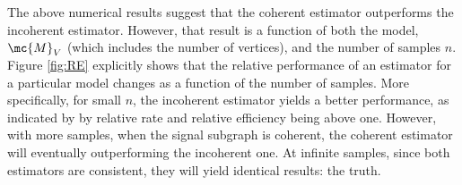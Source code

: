 \documentclass[10pt,journal,cspaper,compsoc]{IEEEtran}
\begin{document}
The above numerical results suggest that the coherent estimator outperforms the incoherent estimator.  However, that result is a function of both the model, $\mc{M}_V$ (which includes the number of vertices), and the number of samples $n$.  %
Figure \ref{fig:RE} explicitly shows that the relative performance of an estimator for a particular model changes as a function of the number of samples.  More specifically, for small $n$, the incoherent estimator yields a better performance, as indicated by by relative rate and relative efficiency being above one.  However, with more samples, when the signal subgraph is coherent, the coherent estimator will eventually outperforming the incoherent one.  At infinite samples, since both estimators are consistent, they will yield identical results: the truth.  


\end{document}
